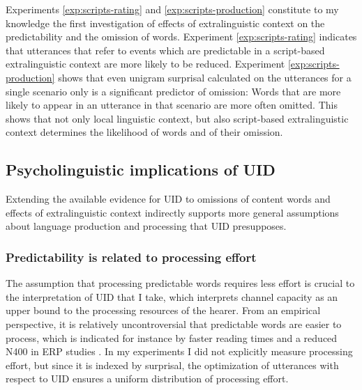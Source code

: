 Experiments \ref{exp:scripts-rating} and \ref{exp:scripts-production} constitute to my knowledge the first investigation of effects of extralinguistic context on the predictability and the omission of words. Experiment \ref{exp:scripts-rating} indicates that utterances that refer to events which are predictable in a script-based extralinguistic context are more likely to be reduced. Experiment \ref{exp:scripts-production} shows that even unigram surprisal calculated on the utterances for a single scenario only is a significant predictor of omission: Words that are more likely to appear in an utterance in that scenario are more often omitted. This shows that not only local linguistic context, but also script-based extralinguistic context determines the likelihood of words and of their omission.

\subsection{Psycholinguistic implications of UID}
Extending the available evidence for UID to omissions of content words and effects of extralinguistic context indirectly supports more general assumptions about language production and processing that UID presupposes. 

\subsubsection{Predictability is related to processing effort}
The assumption that processing predictable words requires less effort is crucial to the interpretation of UID that I take, which interprets channel capacity as an upper bound to the processing resources of the hearer. From an empirical perspective, it is relatively uncontroversial that predictable words are easier to process, which is indicated for instance by faster reading times \citep{demberg.keller2008, levy2008, smith.levy2013, brothers.kuperberg2019} and a reduced N400 in ERP studies \citep{frank.etal2015, delogu.etal2017}. In my experiments I did not explicitly measure processing effort, but since it is indexed by surprisal, the optimization of utterances with respect to UID ensures a uniform distribution of processing effort.

